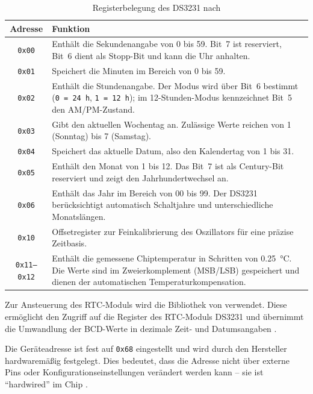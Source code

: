 \begin{table}[H]
	\renewcommand{\arraystretch}{1.25} 
	\centering
	\caption{Registerbelegung des DS3231 nach \cite{MaximIntegrated:2023}}
	\label{tab:ds3231_registers}
	\begin{tabular}{|c|p{9cm}|}
		\hline
		\textbf{Adresse} & \textbf{Funktion} \\ \hline
		\texttt{0x00} & Enthält die Sekundenangabe von 0 bis 59. 
		Bit~7 ist reserviert, Bit~6 dient als Stopp-Bit und kann die Uhr anhalten. \\ \hline
		\texttt{0x01} & Speichert die Minuten im Bereich von 0 bis 59. \\ \hline
		\texttt{0x02} & Enthält die Stundenangabe. 
		Der Modus wird über Bit~6 bestimmt (\texttt{0~=~24\,h}, \texttt{1~=~12\,h}); 
		im 12-Stunden-Modus kennzeichnet Bit~5 den AM/PM-Zustand. \\ \hline
		\texttt{0x03} & Gibt den aktuellen Wochentag an. 
		Zulässige Werte reichen von 1 (Sonntag) bis 7 (Samstag). \\ \hline
		\texttt{0x04} & Speichert das aktuelle Datum, also den Kalendertag von 1 bis 31. \\ \hline
		\texttt{0x05} & Enthält den Monat von 1 bis 12. 
		Das Bit~7 ist als Century-Bit reserviert und zeigt den Jahrhundertwechsel an. \\ \hline
		\texttt{0x06} & Enthält das Jahr im Bereich von 00 bis 99. 
		Der DS3231 berücksichtigt automatisch Schaltjahre und unterschiedliche Monatslängen. \\ \hline
		\texttt{0x10} & Offsetregister zur Feinkalibrierung des Oszillators für eine präzise Zeitbasis. \\ \hline
		\texttt{0x11--0x12} & Enthält die gemessene Chiptemperatur in Schritten von \SI{0,25}{\celsius}. 
		Die Werte sind im Zweierkomplement (MSB/LSB) gespeichert und dienen der automatischen Temperaturkompensation. \\ \hline
	\end{tabular}
\end{table}




\medskip
\noindent
Zur Ansteuerung des RTC-Moduls wird die Bibliothek  von  verwendet. 
Diese ermöglicht den Zugriff auf die Register des RTC-Moduls DS3231 und übernimmt die Umwandlung der BCD-Werte 
in dezimale Zeit- und Datumsangaben \cite{Adafruit:2023}. 


 
Die Geräteadresse ist fest auf \texttt{0x68} eingestellt und wird durch den Hersteller hardwaremäßig festgelegt. 
Dies bedeutet, dass die Adresse nicht über externe Pins oder Konfigurationseinstellungen verändert werden kann – sie ist \enquote{hardwired} im Chip \cite{MaximIntegrated:2023}.  



